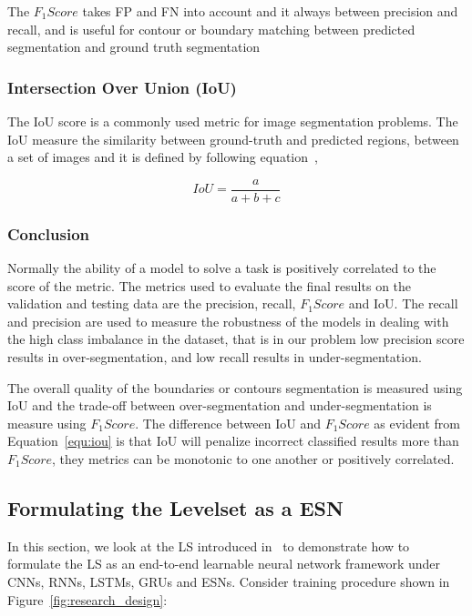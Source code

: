 \documentclass{WitsPhysicsReport}
\begin{document}
The $F_{1}Score$ takes FP and FN into account and it always between precision and recall, and is useful for contour or boundary matching between predicted segmentation and ground truth segmentation

\subsubsection{Intersection Over Union (IoU)}

The IoU score is a commonly used metric for image segmentation problems. The IoU measure the similarity between ground-truth and predicted regions, between a set of images and it is defined by following equation~\cite{rahman2016optimizing}, 

\begin{equation}
    IoU = \frac{a}{a+b+c}
     \label{equ:iou}
\end{equation}

\subsubsection{Conclusion}

Normally the ability of a model to solve a task is positively correlated to the score of the metric. The metrics used to evaluate the final results on the validation and testing data are the precision, recall, $F_{1} Score$ and IoU. The recall and precision are used to measure the robustness of the models in dealing with the high class imbalance in the dataset, that is in our problem low precision score results in over-segmentation, and low recall results in under-segmentation.

The overall quality of the boundaries or contours segmentation is measured using IoU and the trade-off between over-segmentation and under-segmentation is measure using $F_{1} Score$. The difference between IoU and $F_{1} Score$ as evident from Equation~\ref{equ:iou} is that IoU will penalize incorrect classified results more than $F_{1} Score$, they metrics can be monotonic to one another or positively correlated.


\newpage

\subsection{Formulating the Levelset as a ESN}
\label{sec:reformulating_generation}
In this section, we look at the LS introduced in~\cite{chan2000active} to demonstrate how to formulate the LS as an end-to-end learnable neural network framework under CNNs, RNNs, LSTMs, GRUs and ESNs. Consider training procedure shown in Figure~\ref{fig:research_design}:
\end{document}
